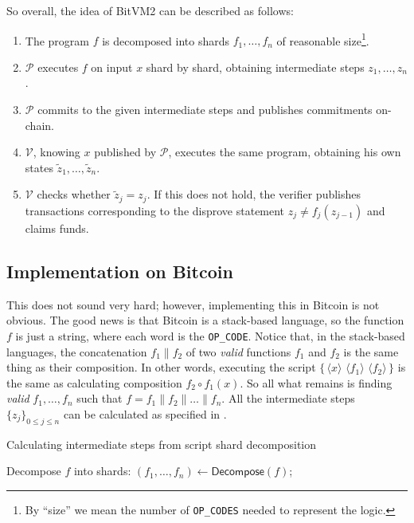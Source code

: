 \documentclass{iacrtrans}
\newcommand{\elem}[1]{\, \langle #1 \rangle \,}
\newcommand{\script}[1]{ $\big\{ #1 \big\}$ }
\begin{document}
So overall, the idea of BitVM2 can be described as follows:
\begin{enumerate}
    \item The program $f$ is decomposed into shards $f_1,\dots,f_n$ of
    reasonable size\footnote{By ``size'' we mean the number of
    \texttt{OP\_CODES} needed to represent the logic.}.
    \item $\mathcal{P}$ executes $f$ on input ${x}$ shard by shard, obtaining
    intermediate steps ${z}_1,\dots,{z}_n$.
    \item $\mathcal{P}$ commits to the given intermediate steps and publishes
    commitments on-chain.
    \item $\mathcal{V}$, knowing ${x}$ published by $\mathcal{P}$, executes the
    same program, obtaining his own states
    $\widetilde{z}_1,\dots,\widetilde{z}_n$.
    \item $\mathcal{V}$ checks whether $\widetilde{z}_j = z_j$. If this does not
    hold, the verifier publishes transactions corresponding to the disprove
    statement $z_j \neq f_j(z_{j-1})$ and claims funds.
\end{enumerate}

\subsection{Implementation on Bitcoin}

This does not sound very hard; however, implementing this in Bitcoin is not
obvious. The good news is that Bitcoin is a stack-based language, so the
function $f$ is just a string, where each word is the \texttt{OP\_CODE}. Notice
that, in the stack-based languages, the concatenation $f_1 \parallel f_2$ of two
\textit{valid} functions $f_1$ and $f_2$ is the same thing as their composition.
In other words, executing the script \script{\elem{x} \elem{f_1} \elem{f_2}} is
the same as calculating composition $f_2 \circ f_1(x)$. So all what remains is
finding \textit{valid} $f_1,\dots,f_n$ such that $f = f_1 \parallel f_{2}
\parallel \dots \parallel f_n$. All the intermediate steps $\{z_j\}_{0 \leq j
\leq n}$ can be calculated as specified in .

\begin{algorithm}[H]
\caption{Calculating intermediate steps from script shard decomposition}

Decompose $f$ into shards: $(f_1,\dots,f_n) \gets \mathsf{Decompose}(f)$;

\For{$i \in \{1,\dots,n\}$}{
    $z_i \gets \mathsf{Exec}(\{\elem{z_{i-1}} \elem{f_i}\})$;
}

\label{alg:intermediate_steps}
\end{algorithm}
\end{document}

